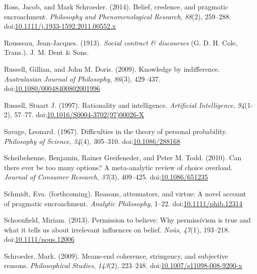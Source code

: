\documentclass[
  10pt,
  letterpaper,
  twoside]{scrbook}
\newlength{\cslhangindent}
\newenvironment{CSLReferences}[2] %
 {\begin{list}{}{%
  \setlength{\itemindent}{0pt}
  \setlength{\leftmargin}{0pt}
  \setlength{\parsep}{0pt}
  \ifodd #1
   \setlength{\leftmargin}{\cslhangindent}
   \setlength{\itemindent}{-1\cslhangindent}
  \fi
  \setlength{\itemsep}{#2\baselineskip}}}
 {\end{list}}
\begin{document}
\begin{CSLReferences}{1}{0}
Ross, Jacob, and Mark Schroeder. (2014). Belief, credence, and pragmatic
encroachment. \emph{Philosophy and Phenomenological Research},
\emph{88}(2), 259--288.
doi:\href{https://doi.org/10.1111/j.1933-1592.2011.00552.x}{10.1111/j.1933-1592.2011.00552.x}

Rousseau, Jean-Jacques. (1913). \emph{Social contract \& discourses} (G.
D. H. Cole, Trans.). J. M. Dent \& Sons.

Russell, Gillian, and John M. Doris. (2009). Knowledge by indifference.
\emph{Australasian Journal of Philosophy}, \emph{86}(3), 429--437.
doi:\href{https://doi.org/10.1080/00048400802001996}{10.1080/00048400802001996}

Russell, Stuart J. (1997). Rationality and intelligence.
\emph{Artificial Intelligence}, \emph{94}(1-2), 57--77.
doi:\href{https://doi.org/10.1016/S0004-3702(97)00026-X}{10.1016/S0004-3702(97)00026-X}

Savage, Leonard. (1967). Difficulties in the theory of personal
probability. \emph{Philosophy of Science}, \emph{34}(4), 305--310.
doi:\href{https://doi.org/10.1086/288168}{10.1086/288168}

Scheibehenne, Benjamin, Rainer Greifeneder, and Peter M. Todd. (2010).
Can there ever be too many options? A meta-analytic review of choice
overload. \emph{Journal of Consumer Research}, \emph{37}(3), 409--425.
doi:\href{https://doi.org/10.1086/651235}{10.1086/651235}

Schmidt, Eva. (forthcoming). Reasons, attenuators, and virtue: A novel
account of pragmatic encroachment. \emph{Analytic Philosophy}, 1--22.
doi:\href{https://doi.org/10.1111/phib.12314}{10.1111/phib.12314}

Schoenfield, Miriam. (2013). Permission to believe: Why permissivism is
true and what it tells us about irrelevant influences on belief.
\emph{No{û}s}, \emph{47}(1), 193--218.
doi:\href{https://doi.org/10.1111/nous.12006}{10.1111/nous.12006}

Schroeder, Mark. (2009). Means-end coherence, stringency, and subjective
reasons. \emph{Philosophical Studies}, \emph{143}(2), 223--248.
doi:\href{https://doi.org/10.1007/s11098-008-9200-x}{10.1007/s11098-008-9200-x}


\end{CSLReferences}
\end{document}
